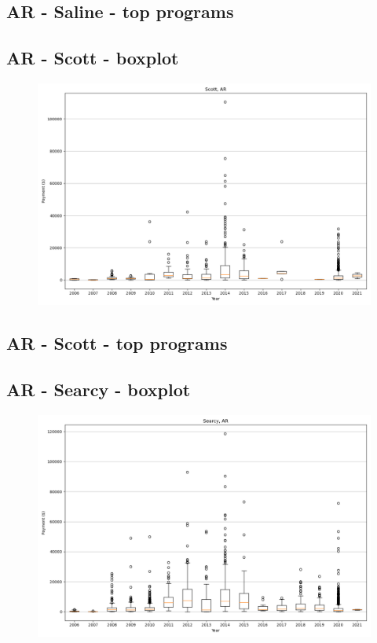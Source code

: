 \subsection*{AR - Saline - top programs}

\newpage
\subsection*{AR - Scott - boxplot}
\begin{figure}[h]
\centering
\includegraphics[width=7in]{../output/boxplots/counties/Scott-AR_boxplot.png}
\end{figure}


\subsection*{AR - Scott - top programs}

\newpage
\subsection*{AR - Searcy - boxplot}
\begin{figure}[h]
\centering
\includegraphics[width=7in]{../output/boxplots/counties/Searcy-AR_boxplot.png}
\end{figure}


